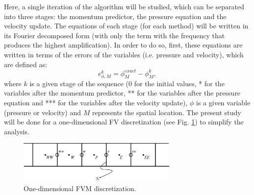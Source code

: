\documentclass[final,3p,times,11pt,onecolumn]{myElsarticle}
\numberwithin{equation}{section}
\begin{document}
Here, a single iteration of the algorithm will be studied, which can be separated into three stages: the momentum predictor, the pressure equation and the velocity update. The equations of each stage (for each method) will be written in its Fourier decomposed form (with only the term with the frequency that produces the highest amplification). In order to do so, first, these equations are written in terms of the errors of the variables (i.e. pressure and velocity), which are defined as:
\begin{equation}
    e^k_{\phi,M} = \phi^{exact}_{M}-\phi_M^{k},
\end{equation}
where $k$ is a given stage of the sequence ($0$ for the initial values, * for the variables after the momentum predictor, ** for the variables after the pressure equation and *** for the variables after the velocity update), $\phi$ is a given variable (pressure or velocity) and $M$ represents the spatial location.
The present study will be done for a one-dimensional FV discretization (see Fig. \ref{fig:4a}) to simplify the analysis.%
\begin{figure}[t!]
    \centering
    \includegraphics[width=0.7\textwidth]{fig/cells.eps}
    \caption{One-dimensional FVM discretization.}
    \label{fig:4a}
\end{figure}
\end{document}

